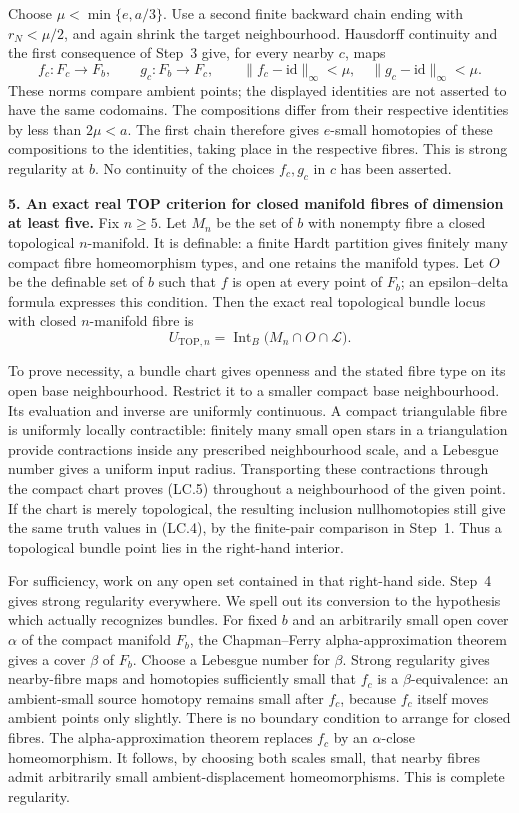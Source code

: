 Choose $\mu<\min\{e,a/3\}$. Use a second finite backward chain ending
with $r_N<\mu/2$, and again shrink the target neighbourhood. Hausdorff
continuity and the first consequence of Step~3 give, for every nearby
$c$, maps
\[
 f_c:F_c\to F_b,\qquad g_c:F_b\to F_c,
 \qquad \|f_c-\mathrm{id}\|_\infty<\mu,\quad
        \|g_c-\mathrm{id}\|_\infty<\mu.
 \tag{LC.9}
\]
These norms compare ambient points; the displayed identities are not
asserted to have the same codomains. The compositions differ from their
respective identities by less than $2\mu<a$. The first chain therefore
gives $e$-small homotopies of these compositions to the identities, taking
place in the respective fibres. This is strong regularity at $b$.
No continuity of the choices $f_c,g_c$ in $c$ has been asserted.

\textbf{5. An exact real TOP criterion for closed manifold fibres of
dimension at least five.}
Fix $n\ge5$. Let $M_n$ be the set of $b$ with nonempty fibre a closed
topological $n$-manifold. It is definable: a finite Hardt partition gives
finitely many compact fibre homeomorphism types, and one retains the
manifold types. Let $O$ be the definable set of $b$ such that $f$ is open
at every point of $F_b$; an epsilon--delta formula expresses this
condition. Then the exact real topological bundle locus with closed
$n$-manifold fibre is
\[
               U_{\mathrm{TOP},n}=\operatorname{Int}_B
                         \bigl(M_n\cap O\cap\mathcal L\bigr).
 \tag{LC.10}
\]

To prove necessity, a bundle chart gives openness and the stated fibre
type on its open base neighbourhood. Restrict it to a smaller compact
base neighbourhood. Its evaluation and inverse are uniformly continuous.
A compact triangulable fibre is uniformly locally contractible: finitely
many small open stars in a triangulation provide contractions inside any
prescribed neighbourhood scale, and a Lebesgue number gives a uniform
input radius. Transporting these contractions through the compact chart
proves (LC.5) throughout a neighbourhood of the given point. If the chart
is merely topological, the resulting inclusion nullhomotopies still
give the same truth values in (LC.4), by the finite-pair comparison in
Step~1. Thus a topological bundle point lies in the right-hand interior.

For sufficiency, work on any open set contained in that right-hand side.
Step~4 gives strong regularity everywhere. We spell out its conversion
to the hypothesis which actually recognizes bundles. For fixed $b$ and
an arbitrarily small open cover $\alpha$ of the compact manifold $F_b$,
the Chapman--Ferry alpha-approximation theorem gives a cover $\beta$
of $F_b$. Choose a Lebesgue number for $\beta$. Strong regularity gives
nearby-fibre maps and homotopies sufficiently small that $f_c$ is a
$\beta$-equivalence: an ambient-small source homotopy remains small
after $f_c$, because $f_c$ itself moves ambient points only slightly.
There is no boundary condition to arrange for closed fibres. The
alpha-approximation theorem replaces $f_c$ by an $\alpha$-close
homeomorphism. It follows, by choosing both scales small, that nearby
fibres admit arbitrarily small ambient-displacement homeomorphisms.
This is complete regularity.

